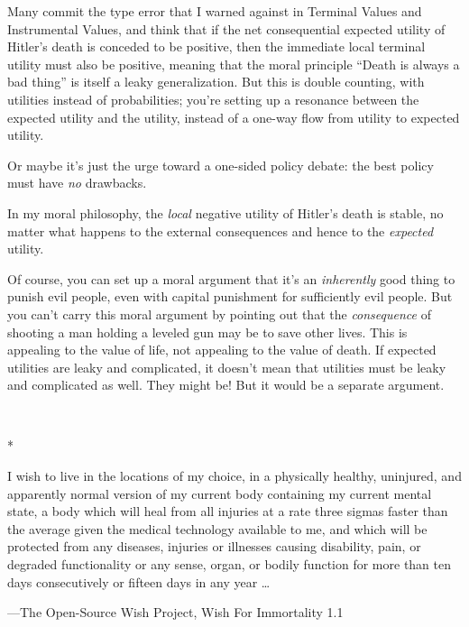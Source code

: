 {
 Many commit the type error that I warned against in Terminal
Values and Instrumental Values, and think that if the net consequential
expected utility of Hitler's death is conceded to be
positive, then the immediate local terminal utility must also be
positive, meaning that the moral principle ``Death is
always a bad thing'' is itself a leaky
generalization. But this is double counting, with utilities instead of
probabilities; you're setting up a resonance between
the expected utility and the utility, instead of a one-way flow from
utility to expected utility.}

{
 Or maybe it's just the urge toward a one-sided
policy debate: the best policy must have \textit{no} drawbacks.}

{
 In my moral philosophy, the \textit{local} negative utility of
Hitler's death is stable, no matter what happens to the
external consequences and hence to the \textit{expected} utility.}

{
 Of course, you can set up a moral argument that
it's an \textit{inherently} good thing to punish evil
people, even with capital punishment for sufficiently evil people. But
you can't carry this moral argument by pointing out
that the \textit{consequence} of shooting a man holding a leveled gun
may be to save other lives. This is appealing to the value of life, not
appealing to the value of death. If expected utilities are leaky and
complicated, it doesn't mean that utilities must be
leaky and complicated as well. They might be! But it would be a
separate argument.}

{\centering
 \ ~
\par}

{\centering
 *
\par}


{
 I wish to live in the locations of my choice, in a physically
healthy, uninjured, and apparently normal version of my current body
containing my current mental state, a body which will heal from all
injuries at a rate three sigmas faster than the average given the
medical technology available to me, and which will be protected from
any diseases, injuries or illnesses causing disability, pain, or
degraded functionality or any sense, organ, or bodily function for more
than ten days consecutively or fifteen days in any year \ldots}

{\raggedleft
 {}---The Open-Source Wish Project, Wish For Immortality 1.1
\par}


